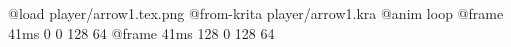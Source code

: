 @load player/arrow1.tex.png
@from-krita player/arrow1.kra
@anim loop
	@frame 41ms 0 0 128 64
	@frame 41ms 128 0 128 64

